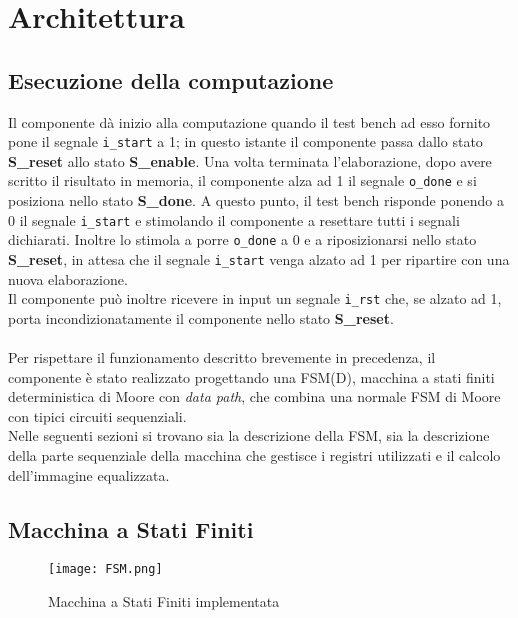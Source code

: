 \documentclass{article}
\begin{document}
\vspace{4mm}
\titlerule[0.4pt]


\pagebreak
\section{Architettura} \label{subsection-arch}

\subsection{Esecuzione della computazione}
Il componente dà inizio alla computazione quando il test bench ad esso fornito pone il segnale \verb^i_start^ a 1; in questo istante il componente passa dallo stato \textbf{S\_reset} allo stato \textbf{S\_enable}. Una volta terminata l'elaborazione, dopo avere scritto il risultato in memoria, il componente alza ad 1 il segnale \verb^o_done^ e si posiziona nello stato \textbf{S\_done}. A questo punto, il test bench risponde ponendo a 0 il segnale \verb^i_start^ e stimolando il componente a resettare tutti i segnali dichiarati. Inoltre lo stimola a porre \verb^o_done^ a 0 e a riposizionarsi nello stato \textbf{S\_reset}, in attesa che il segnale \verb^i_start^ venga alzato ad 1 per ripartire con una nuova elaborazione.\\
Il componente può inoltre ricevere in input un segnale \verb^i_rst^ che, se alzato ad 1, porta incondizionatamente il componente nello stato \textbf{S\_reset}.\\ \\
Per rispettare il funzionamento descritto brevemente in precedenza, il componente è stato realizzato progettando una FSM(D), macchina a stati finiti deterministica di Moore con \textit{data path}, che combina una normale FSM di Moore con tipici circuiti sequenziali.\\
Nelle seguenti sezioni si trovano sia la descrizione della FSM, sia la descrizione della parte sequenziale della macchina che gestisce i registri utilizzati e il calcolo dell'immagine equalizzata.

\subsection{Macchina a Stati Finiti}

\begin{figure}[H]
	\centering
	\texttt{[image: FSM.png]}
	\caption{Macchina a Stati Finiti implementata}
	\label{fig:FSM}
\end{figure}
\end{document}
